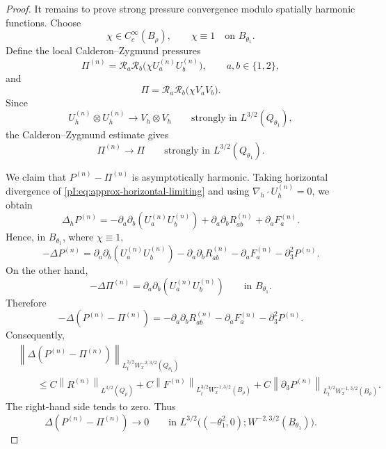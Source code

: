 \documentclass[10pt,a4paper]{amsart}
\newcommand{\calR}{\mathcal R}
\newcommand{\divh}{\nabla_h\!\cdot}
\newcommand{\norm}[2]{\left\|#1\right\|_{#2}}
\begin{document}
\begin{proof}
It remains to prove strong pressure convergence modulo spatially harmonic functions.  Choose
\[
        \chi\in C_c^\infty(B_\rho),
        \qquad
        \chi\equiv1\quad\text{on }B_{\theta_1}.
\]
Define the local Calderon--Zygmund pressures
\[
        \Pi^{(n)}
        =
        \calR_a\calR_b
        \bigl(\chi U_a^{(n)}U_b^{(n)}\bigr),
        \qquad a,b\in\{1,2\},
\]
and
\[
        \Pi
        =
        \calR_a\calR_b
        \bigl(\chi V_aV_b\bigr).
\]
Since
\[
        U_h^{(n)}\otimes U_h^{(n)}
        \to
        V_h\otimes V_h
        \qquad\text{strongly in }L^{3/2}(Q_{\theta_1}),
\]
the Calderon--Zygmund estimate gives
\[
        \Pi^{(n)}\to\Pi
        \qquad\text{strongly in }L^{3/2}(Q_{\theta_1}).
\]

We claim that \(P^{(n)}-\Pi^{(n)}\) is asymptotically harmonic.  Taking horizontal divergence of \eqref{pI:eq:approx-horizontal-limiting} and using \(\divh U_h^{(n)}=0\), we obtain
\[
        \Delta_hP^{(n)}
        =
        -\partial_a\partial_b(U_a^{(n)}U_b^{(n)})
        +\partial_a\partial_bR_{ab}^{(n)}
        +\partial_aF_a^{(n)} .
\]
Hence, in \(B_{\theta_1}\), where \(\chi\equiv1\),
\[
        -\Delta P^{(n)}
        =
        \partial_a\partial_b(U_a^{(n)}U_b^{(n)})
        -\partial_a\partial_bR_{ab}^{(n)}
        -\partial_aF_a^{(n)}
        -\partial_3^2P^{(n)} .
\]
On the other hand,
\[
        -\Delta\Pi^{(n)}
        =
        \partial_a\partial_b(U_a^{(n)}U_b^{(n)})
        \qquad\text{in }B_{\theta_1}.
\]
Therefore
\[
        -\Delta(P^{(n)}-\Pi^{(n)})
        =
        -\partial_a\partial_bR_{ab}^{(n)}
        -\partial_aF_a^{(n)}
        -\partial_3^2P^{(n)} .
\]
Consequently,
\begin{align*}
&\norm{\Delta(P^{(n)}-\Pi^{(n)})}
{L^{3/2}_tW^{-2,3/2}_x(Q_{\theta_1})}
\\
&\qquad\le
C\norm{R^{(n)}}{L^{3/2}(Q_\rho)}
+
C\norm{F^{(n)}}{L^{3/2}_tW^{-1,3/2}_x(B_\rho)}
+
C\norm{\partial_3P^{(n)}}{L^{3/2}_tW^{-1,3/2}_x(B_\rho)} .
\end{align*}
The right-hand side tends to zero.  Thus
\[
        \Delta(P^{(n)}-\Pi^{(n)})\to0
        \qquad\text{in }
        L^{3/2}\bigl((-\theta_1^2,0);W^{-2,3/2}(B_{\theta_1})\bigr).
\]


\end{proof}
\end{document}
